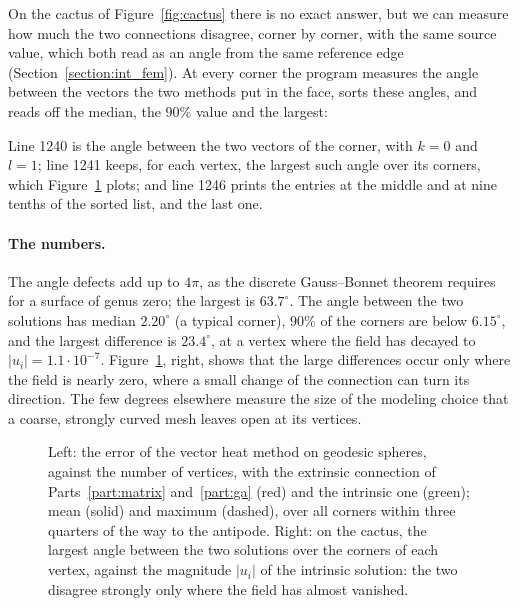 On the cactus of Figure~\ref{fig:cactus} there is no exact answer, but we can measure how much the two connections disagree, corner by corner, with the same source value, which both read as an angle from the same reference edge (Section~\ref{section:int_fem}). At every corner the program measures the angle between the vectors the two methods put in the face, sorts these angles, and reads off the median, the $90\%$ value and the largest:

Line 1240 is the angle between the two vectors of the corner, with $k = 0$ and $l = 1$; line 1241 keeps, for each vertex, the largest such angle over its corners, which Figure~\ref{fig:intrinsic_plots} plots; and line 1246 prints the entries at the middle and at nine tenths of the sorted list, and the last one.

\paragraph{The numbers.} The angle defects add up to $4\pi$, as the discrete Gauss--Bonnet theorem requires for a surface of genus zero; the largest is $63.7^\circ$. The angle between the two solutions has median $2.20^\circ$ (a typical corner), $90\%$ of the corners are below $6.15^\circ$, and the largest difference is $23.4^\circ$, at a vertex where the field has decayed to $|u_i| = 1.1 \cdot 10^{-7}$. Figure~\ref{fig:intrinsic_plots}, right, shows that the large differences occur only where the field is nearly zero, where a small change of the connection can turn its direction. The few degrees elsewhere measure the size of the modeling choice that a coarse, strongly curved mesh leaves open at its vertices.
\begin{figure}[t]
\centering
{}
\caption{Left: the error of the vector heat method on geodesic spheres, against the number of vertices, with the extrinsic connection of Parts~\ref{part:matrix} and~\ref{part:ga} (red) and the intrinsic one (green); mean (solid) and maximum (dashed), over all corners within three quarters of the way to the antipode. Right: on the cactus, the largest angle between the two solutions over the corners of each vertex, against the magnitude $|u_i|$ of the intrinsic solution: the two disagree strongly only where the field has almost vanished.}
\label{fig:intrinsic_plots}
\end{figure}

